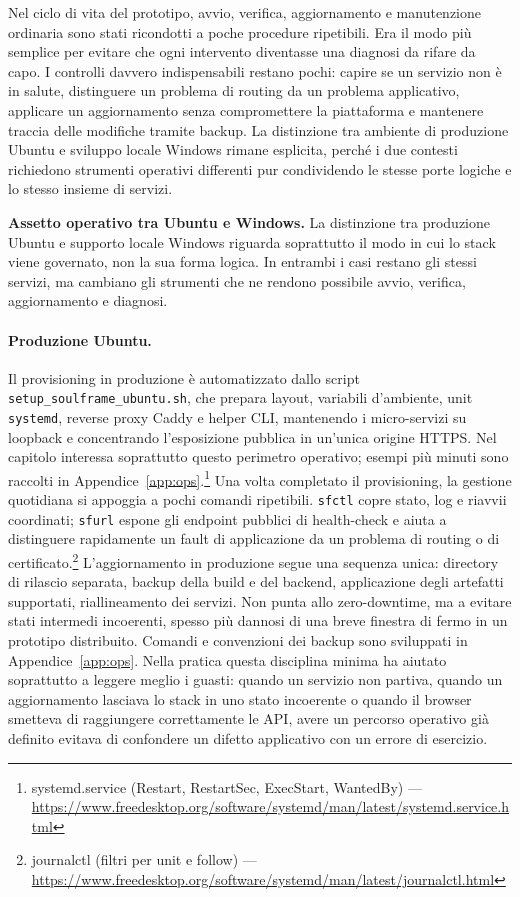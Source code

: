 Nel ciclo di vita del prototipo, avvio, verifica, aggiornamento e manutenzione ordinaria sono stati ricondotti a poche procedure ripetibili. Era il modo più semplice per evitare che ogni intervento diventasse una diagnosi da rifare da capo. I controlli davvero indispensabili restano pochi: capire se un servizio non è in salute, distinguere un problema di routing da un problema applicativo, applicare un aggiornamento senza compromettere la piattaforma e mantenere traccia delle modifiche tramite backup. La distinzione tra ambiente di produzione Ubuntu e sviluppo locale Windows rimane esplicita, perché i due contesti richiedono strumenti operativi differenti pur condividendo le stesse porte logiche e lo stesso insieme di servizi.

\noindent\textbf{Assetto operativo tra Ubuntu e Windows.}
La distinzione tra produzione Ubuntu e supporto locale Windows riguarda soprattutto il modo in cui lo stack viene governato, non la sua forma logica. In entrambi i casi restano gli stessi servizi, ma cambiano gli strumenti che ne rendono possibile avvio, verifica, aggiornamento e diagnosi.

\paragraph{Produzione Ubuntu.}
Il provisioning in produzione è automatizzato dallo script \texttt{setup\_soulframe\_ubuntu.sh}, che prepara layout, variabili d'ambiente, unit \texttt{systemd}, reverse proxy Caddy e helper CLI, mantenendo i micro-servizi su loopback e concentrando l'esposizione pubblica in un'unica origine HTTPS. Nel capitolo interessa soprattutto questo perimetro operativo; esempi più minuti sono raccolti in Appendice~\ref{app:ops}.\footnote{systemd.service (Restart, RestartSec, ExecStart, WantedBy) --- \url{https://www.freedesktop.org/software/systemd/man/latest/systemd.service.html}} Una volta completato il provisioning, la gestione quotidiana si appoggia a pochi comandi ripetibili. \texttt{sfctl} copre stato, log e riavvii coordinati; \texttt{sfurl} espone gli endpoint pubblici di health-check e aiuta a distinguere rapidamente un fault di applicazione da un problema di routing o di certificato.\footnote{journalctl (filtri per unit e follow) --- \url{https://www.freedesktop.org/software/systemd/man/latest/journalctl.html}} L'aggiornamento in produzione segue una sequenza unica: directory di rilascio separata, backup della build e del backend, applicazione degli artefatti supportati, riallineamento dei servizi. Non punta allo zero-downtime, ma a evitare stati intermedi incoerenti, spesso più dannosi di una breve finestra di fermo in un prototipo distribuito. Comandi e convenzioni dei backup sono sviluppati in Appendice~\ref{app:ops}. Nella pratica questa disciplina minima ha aiutato soprattutto a leggere meglio i guasti: quando un servizio non partiva, quando un aggiornamento lasciava lo stack in uno stato incoerente o quando il browser smetteva di raggiungere correttamente le API, avere un percorso operativo già definito evitava di confondere un difetto applicativo con un errore di esercizio.

